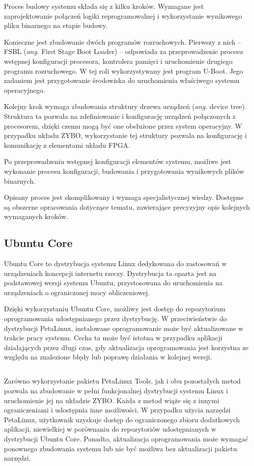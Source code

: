 Proces budowy systemu składa się z kilku kroków. Wymagane jest zaprojektowanie połączeń logiki reprogramowalnej i wykorzystanie wynikowego pliku binarnego na etapie budowy.

Konieczne jest zbudowanie dwóch programów rozruchowych. Pierwszy z nich -- FSBL (\emph{ang.} First Stage Boot Loader) -- odpowiada za przeprowadzenie procesu wstępnej konfiguracji procesora, kontrolera pamięci i uruchomienie drugiego programu rozruchowego. W tej roli wykorzystywany jest program U-Boot. Jego zadaniem jest przygotowanie środowiska do uruchomienia właściwego systemu operacyjnego.

Kolejny krok wymaga zbudowania struktury drzewa urządzeń (\emph{ang.} device tree). Struktura ta pozwala na zdefiniowanie i konfigurację urządzeń połączonych z procesorem, dzięki czemu mogą być one obsłużone przez system operacyjny. W przypadku układu ZYBO, wykorzystanie tej struktury pozwala na konfigurację i komunikację z elementami układu FPGA.

Po przeprowadzeniu wstępnej konfiguracji elementów systemu, możliwe jest wykonanie procesu konfiguracji, budowania i przygotowania wynikowych plików binarnych.

Opisany proces jest skomplikowany i wymaga specjalistycznej wiedzy. Dostępne są obszerne opracowania dotyczące tematu, zawierające precyzyjny opis kolejnych wymaganych kroków. \cite{zybo-zynq-getting-started,zybo-stock-linux,xilinx-build-kernel}

\subsection{Ubuntu Core}
Ubuntu Core to dystrybucja systemu Linux dedykowana do zastosowań w urządzeniach koncepcji internetu rzeczy. Dystrybucja ta oparta jest na podstawowej wersji systemu Ubuntu, przystosowana do uruchomienia na urządzeniach o ograniczonej mocy obliczeniowej.

Dzięki wykorzystaniu Ubuntu Core, możliwy jest dostęp do repozytorium oprogramowania udostępnianego przez dystrybucję. W przeciwieństwie do dystrybucji PetaLinux, instalowane oprogramowanie może być aktualizowane w trakcie pracy systemu. Cecha ta może być istotna w przypadku aplikacji działających przez długi czas, gdy aktualizacja oprogramowania jest korzystna ze względu na znalezione błędy lub poprawę działania w kolejnej wersji.

\subsection*{}
Zarówno wykorzystanie pakietu PetaLinux Tools, jak i obu pozostałych metod pozwala na zbudowanie w pełni funkcjonalnej dystrybucji systemu Linux i uruchomienie jej na układzie ZYBO. Każda z metod wiąże się z innymi ograniczeniami i udostępnia inne możliwości. W przypadku użycia narzędzi PetaLinux, użytkownik uzyskuje dostęp do ograniczonego zbioru dodatkowych aplikacji, niewielkiej w porównaniu do repozytoriów udostępnianych w dystrybucji Ubuntu Core. Ponadto, aktualizacja oprogramowania może wymagać ponownego zbudowania systemu lub nie być możliwa bez aktualizacji pakietu narzędzi. 

